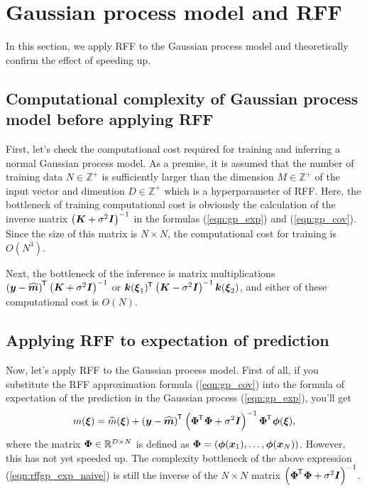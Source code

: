 \documentclass[twocolumn, a4paper, 10pt]{article}
\begin{document}

\section{Gaussian process model and RFF}\titlebar

In this section, we apply RFF to the Gaussian process model
and theoretically confirm the effect of speeding up.

\subsection{Computational complexity of Gaussian process model before applying RFF}

First, let's check the computational cost required for training and inferring a normal Gaussian
process model. As a premise, it is assumed that the number of training data $N \in \mathbb{Z}^{+}$
is sufficiently larger than the dimension $M \in \mathbb{Z}^{+}$ of the input vector and 
dimention $D \in \mathbb{Z}^{+}$ which is a hyperparameter of RFF. Here, the bottleneck of
training computational cost is obviously the calculation of the inverse matrix
$\left (\boldsymbol{K} + \sigma^2 \boldsymbol{I} \right)^{-1}$ in the formulas (\ref{eqn:gp_exp}) and (\ref{eqn:gp_cov}).
Since the size of this matrix is $N \times N$, the computational cost for training is $O(N^3)$.

Next, the bottleneck of the inference is matrix multiplications
$\left (\boldsymbol{y} -\widehat{\boldsymbol{m}} \right)^{\mkern-1.5mu\mathsf{T}}\hspace{0.5pt} \left( \boldsymbol{K} + \sigma^2 \boldsymbol{I} \right)^{-1}$ or
$\boldsymbol{k} (\boldsymbol{\xi}_1)^{\mkern-1.5mu\mathsf{T}}\hspace{0.5pt} \left( \boldsymbol{K} - \sigma^2 \boldsymbol{I} \right)^{-1} \boldsymbol{k} (\boldsymbol{\xi}_2)$,
and either of these computational cost is $O(N)$.

\subsection{Applying RFF to expectation of prediction}

Now, let's apply RFF to the Gaussian process model. First of all, if you substitute the RFF
approximation formula (\ref{eqn:gp_cov}) into the formula of expectation of the prediction
in the Gaussian process (\ref{eqn:gp_exp}), you'll get
\begin{equation}
    m (\boldsymbol{\xi}) = \widehat{m} (\boldsymbol{\xi}) + \left( \boldsymbol{y} - \widehat{\boldsymbol{m}} \right)^{\mkern-1.5mu\mathsf{T}}\hspace{0.5pt}
    \left( \boldsymbol{\Phi}^{\mkern-1.5mu\mathsf{T}}\hspace{0.5pt} \boldsymbol{\Phi} + \sigma^2 \boldsymbol{I} \right)^{-1} \boldsymbol{\Phi}^{\mkern-1.5mu\mathsf{T}}\hspace{0.5pt} \boldsymbol{\phi} (\boldsymbol{\xi}),
    \label{eqn:rffgp_exp_naive}
\end{equation}
where the matrix $\boldsymbol{\Phi} \in \mathbb{R}^{D \times N}$ is defined as
$\boldsymbol{\Phi} = (\boldsymbol{\phi} (\boldsymbol{x}_1), \ldots, \boldsymbol{\phi} (\boldsymbol{x}_N))$.
However, this has not yet speeded up. The complexity bottleneck of the above expression
(\ref{eqn:rffgp_exp_naive}) is still the inverse of the $N \times N$ matrix
$\left( \boldsymbol{\Phi}^{\mkern-1.5mu\mathsf{T}}\hspace{0.5pt} \boldsymbol{\Phi} + \sigma^2 \boldsymbol{I} \right)^{-1}$.
\end{document}
